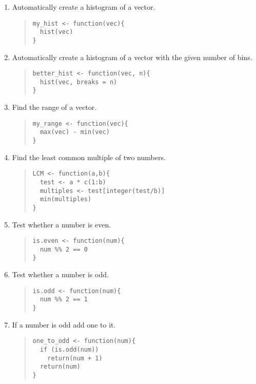 \documentclass{article}
\begin{document}
\begin{enumerate}
\item Automatically create a histogram of a vector.
  \begin{quote}
    \begin{verbatim}
my_hist <- function(vec){
  hist(vec)
}
    \end{verbatim}
  \end{quote}

\item Automatically create a histogram of a vector with the given number of bins.
  \begin{quote}
    \begin{verbatim}
better_hist <- function(vec, n){
  hist(vec, breaks = n)
}
    \end{verbatim}
  \end{quote}

\item Find the range of a vector.
  \begin{quote}
    \begin{verbatim}
my_range <- function(vec){
  max(vec) - min(vec)
}
    \end{verbatim}
  \end{quote}

\item Find the least common multiple of two numbers.
  \begin{quote}
    \begin{verbatim}
LCM <- function(a,b){
  test <- a * c(1:b)
  multiples <- test[integer(test/b)] 
  min(multiples)
} 
    \end{verbatim}
  \end{quote}

\item Test whether a number is even.
  \begin{quote}
    \begin{verbatim}
is.even <- function(num){
  num %% 2 == 0
}

    \end{verbatim}
  \end{quote}

\item Test whether a number is odd.
  \begin{quote}
    \begin{verbatim}
is.odd <- function(num){
  num %% 2 == 1
}
    \end{verbatim}
  \end{quote}

\item If a number is odd add one to it.
  \begin{quote}
    \begin{verbatim}
one_to_odd <- function(num){
  if (is.odd(num))
    return(num + 1)
  return(num)
} 
    \end{verbatim}
  \end{quote}


\end{enumerate}
\end{document}
